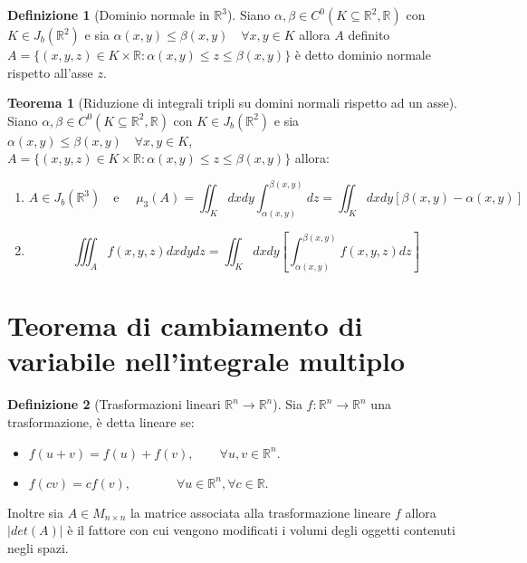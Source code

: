 \documentclass[leqno]{article}
\theoremstyle{definition}
\newtheorem{definition}{Definizione}[section]
\numberwithin{equation}{section}
\newtheorem{theorem}{Teorema}[section]
\theoremstyle{remark}
\begin{document}
	\begin{definition}[Dominio normale in $\mathbb{R}^3$]
		Siano $\alpha ,\beta \in C^0(K \subseteq \mathbb{R}^2,\mathbb{R})$ con $K \in J_b(\mathbb{R}^2)$ e sia $\alpha(x,y)\le \beta(x,y) \quad \forall x,y \in K$ allora $A$ definito $A=\{(x,y,z) \in K \times \mathbb{R}:\alpha(x,y)\le z \le \beta(x,y)\}$ è detto dominio normale rispetto all'asse $z$. 
	\end{definition}
	\begin{theorem}[Riduzione di integrali tripli su domini normali rispetto ad un asse]
		Siano $\alpha,\beta \in C^0(K\subseteq \mathbb{R}^2,\mathbb{R})$ con $K\in J_b(\mathbb{R}^2)$ e sia $\alpha(x,y)\le \beta(x,y) \quad \forall x,y\in K$, $A=\{(x,y,z)\in K\times \mathbb{R}:\alpha(x,y)\le z \le \beta(x,y)\}$ allora:
		\begin{enumerate}
			\item \begin{equation}       
				A\in J_b(\mathbb{R}^3) \quad \text{e } \quad\mu_3(A)=\iint_Kdxdy\int_{\alpha(x,y)}^{\beta(x,y)}dz= \iint_K dxdy[\beta(x,y)-\alpha(x,y)]
			\end{equation}
			\item \begin{equation}
				\iiint_Af(x,y,z)dxdydz=\iint_Kdxdy\left[\int_{\alpha(x,y)}^{\beta(x,y)}f(x,y,z)dz\right]
			\end{equation}
		\end{enumerate}
		
	\end{theorem}
	
	
	\section{Teorema di cambiamento di variabile nell'integrale multiplo}
	
	\begin{definition}[Trasformazioni lineari $\mathbb{R}^n \to \mathbb{R}^n$]
		Sia $f:\mathbb{R}^n \to \mathbb{R}^n$ una trasformazione, è detta lineare se:
		\begin{itemize}
			\item $f(u+v)=f(u) + f(v), \quad \quad \forall u,v \in \mathbb{R}^n.$
			\item $f(cv)=cf(v), \quad \quad \quad \; \; 
			\forall u\in \mathbb{R}^n, \forall c \in \mathbb{R}.$
		\end{itemize}
		Inoltre sia $A\in M_{n\times n}$ la matrice associata alla trasformazione lineare $f$ allora $\left| det(A) \right|$ è il fattore con cui vengono modificati i volumi degli oggetti contenuti negli spazi. 
	\end{definition}
	
\end{document}
